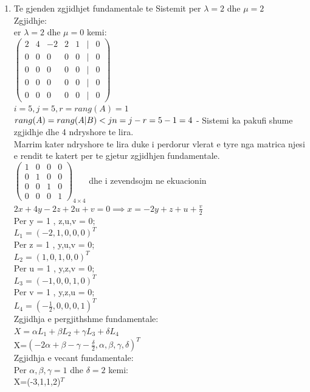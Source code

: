 \documentclass[12pt]{article}
\begin{document}
\begin{enumerate}
    \item Te gjenden zgjidhjet fundamentale te Sistemit per $\lambda=2$ dhe $\mu = 2$\\
          Zgjidhje:\\
          er $\lambda=2$ dhe $\mu =0$ kemi:\\
          $\left(\begin{matrix}
                      2 & 4 & -2 & 2 & 1 & | & 0 \\
                      0 & 0 & 0  & 0 & 0 & | & 0 \\
                      0 & 0 & 0  & 0 & 0 & | & 0 \\
                      0 & 0 & 0  & 0 & 0 & | & 0 \\
                      0 & 0 & 0  & 0 & 0 & | & 0
                  \end{matrix}\right)$\\
          $i=5, j=5,r= rang(A)=1$
          $rang(A)=rang(A|B)<j\\
              n=j-r = 5-1 = 4$ - Sistemi ka pakufi shume zgjidhje dhe 4 ndryshore te lira.\\
          Marrim kater ndryshore te lira duke i perdorur vlerat e tyre nga matrica njesi e rendit te katert per te gjetur zgjidhjen fundamentale.\\
          $\left(\begin{matrix}
                  1 & 0 & 0 & 0 \\
                  0 & 1 & 0 & 0 \\
                  0 & 0 & 1 & 0 \\
                  0 & 0 & 0 & 1
              \end{matrix}\right)_{4\times4}$
          dhe i zevendsojm ne ekuacionin $2x+4y-2z+2u+v=0 \implies x=-2y+z+u+\frac{v}{2}$\\

          Per  y = 1 , z,u,v = 0;\\
          $L_1=(-2,1,0,0,0)^T$\\
          Per  z = 1 , y,u,v = 0;\\
          $L_2=(1,0,1,0,0)^T$\\
          Per  u = 1 , y,z,v = 0;\\
          $L_3=(-1,0,0,1,0)^T$\\
          Per  v = 1 , y,z,u = 0;\\
          $L_4=(-\frac{1}{2},0,0,0,1)^T$\\
          Zgjidhja e pergjithshme fundamentale:\\
          $X=\alpha L_1 + \beta L_2 + \gamma L_3 + \delta L_4$\\
          \large X=$(-2\alpha + \beta - \gamma  - \frac{\delta}{2},\alpha,\beta,\gamma,\delta)^T$\\
          Zgjidhja e vecant fundamentale:\\
          Per $\alpha,\beta,\gamma = 1$ dhe $\delta=2$ kemi:\\
          \Large X=(-3,1,1,2)$^T$

\end{enumerate}
\end{document}

